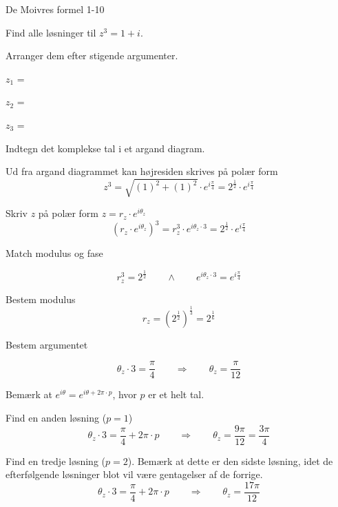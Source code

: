 \documentclass{article}
\begin{document}
\newpage

\begin{exercise}{De Moivres formel 1-10}

Find alle løsninger til $z^3=1+i$. 

Arranger dem efter stigende argumenter.

$z_1$ = 		

$z_2$ = 		

$z_3$ = 	


\hint 

Indtegn det komplekse tal i et argand diagram. 

\hint 

Ud fra argand diagrammet kan højresiden skrives på polær form
\[
z^3 = \sqrt{(1)^2+(1)^2} \cdot e^{i \frac{\pi}{4}} = 2^{\frac{1}{2}} \cdot e^{i \frac{\pi}{4}} 
\]


\hint

Skriv $z$ på polær form $z = r_z \cdot e^{i \theta_z}$
\[
\left(r_z \cdot e^{i \theta_z}\right)^3 = r_z^3 \cdot e^{i \theta_z \cdot 3} = 2^{\frac{1}{2}} \cdot e^{i \frac{ \pi}{4}} 
\]

\hint 
Match modulus og fase

\[
r_z^3 = 2^{\frac{1}{2}} \qquad \wedge \qquad e^{i \theta_z \cdot 3} = e^{i \frac{\pi}{4}} 
\]

\hint

Bestem modulus
\[
r_z  =  \left(2^{\frac{1}{2}} \right)^{\frac{1}{3}} = 2^{\frac{1}{6}}
\]

\hint

Bestem argumentet

\[
\theta_z \cdot 3 = \frac{\pi}{4} \qquad \Rightarrow \qquad  \theta_z = \frac{\pi}{12}
\]

\hint

Bemærk at $e^{i \theta} = e^{i \theta + 2 \pi \cdot p}$, hvor $p$ er et helt tal.

\hint

Find en anden løsning ($p=1$)
\[
\theta_z \cdot 3 = \frac{\pi}{4}  + 2 \pi \cdot p \qquad \Rightarrow \qquad  \theta_z = \frac{9 \pi}{12} = \frac{3\pi}{4}
\]

\hint

Find en tredje løsning ($p=2$). 
Bemærk at dette er den sidste løsning, idet de efterfølgende 
løsninger blot vil være gentagelser af de forrige.
\[
\theta_z \cdot 3 = \frac{\pi}{4}  + 2 \pi \cdot p \qquad \Rightarrow  \qquad  \theta_z = \frac{17 \pi}{12}
\]


\end{exercise}
\end{document}

